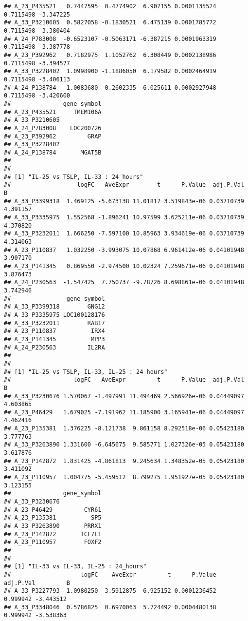 \documentclass[
]{article}
\begin{document}
\begin{verbatim}
## A_23_P435521   0.7447595  0.4774902  6.907155 0.0001135524 0.7115498 -3.347225
## A_33_P3210605  0.5827058 -0.1830521  6.475139 0.0001785772 0.7115498 -3.380404
## A_24_P783008  -0.6523107 -0.5063171 -6.387215 0.0001963319 0.7115498 -3.387778
## A_23_P392962   0.7182975  1.1052762  6.308449 0.0002138986 0.7115498 -3.394577
## A_33_P3228402  1.0998900 -1.1886050  6.179582 0.0002464919 0.7115498 -3.406113
## A_24_P138784   1.0083680 -0.2602335  6.025611 0.0002927948 0.7115498 -3.420600
##               gene_symbol
## A_23_P435521     TMEM106A
## A_33_P3210605            
## A_24_P783008    LOC200726
## A_23_P392962         GRAP
## A_33_P3228402            
## A_24_P138784       MGAT5B
## 
## 
## [1] "IL-25 vs TSLP, IL-33 : 24_hours"
##                   logFC   AveExpr        t      P.Value  adj.P.Val        B
## A_33_P3399318  1.469125 -5.673138 11.01817 3.519843e-06 0.03710739 4.391157
## A_33_P3335975  1.552568 -1.896241 10.97599 3.625211e-06 0.03710739 4.370820
## A_33_P3232011  1.666250 -7.597100 10.85963 3.934619e-06 0.03710739 4.314063
## A_23_P110837   1.032250 -3.993075 10.07868 6.961412e-06 0.04101948 3.907170
## A_23_P141345   0.869550 -2.974500 10.02324 7.259671e-06 0.04101948 3.876473
## A_24_P230563  -1.547425  7.750737 -9.78726 8.698861e-06 0.04101948 3.742946
##                gene_symbol
## A_33_P3399318        GNG12
## A_33_P3335975 LOC100128176
## A_33_P3232011        RAB17
## A_23_P110837          IRX4
## A_23_P141345          MPP3
## A_24_P230563         IL2RA
## 
## 
## [1] "IL-25 vs TSLP, IL-33, IL-25 : 24_hours"
##                  logFC   AveExpr         t      P.Value  adj.P.Val        B
## A_33_P3230676 1.570067 -1.497991 11.494469 2.566926e-06 0.04449097 4.603865
## A_23_P46429   1.679025 -7.191962 11.185900 3.165941e-06 0.04449097 4.462416
## A_23_P135381  1.376225 -8.121738  9.861158 8.292518e-06 0.05423180 3.777763
## A_33_P3263890 1.331600 -6.645675  9.585771 1.027326e-05 0.05423180 3.617876
## A_23_P142872  1.831425 -4.861813  9.245634 1.348352e-05 0.05423180 3.411092
## A_23_P110957  1.004775 -5.459512  8.799275 1.951927e-05 0.05423180 3.123155
##               gene_symbol
## A_33_P3230676            
## A_23_P46429         CYR61
## A_23_P135381          SP5
## A_33_P3263890       PRRX1
## A_23_P142872       TCF7L1
## A_23_P110957        FOXF2
## 
## 
## [1] "IL-33 vs IL-33, IL-25 : 24_hours"
##                    logFC    AveExpr         t      P.Value adj.P.Val         B
## A_33_P3227793 -1.0980250 -3.5912875 -6.925152 0.0001236452  0.999942 -3.443512
## A_33_P3348046  0.5786825  0.6970063  5.724492 0.0004480138  0.999942 -3.538363

\end{verbatim}
\end{document}
